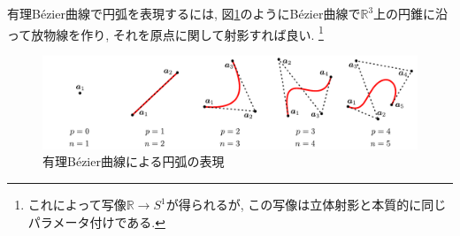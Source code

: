 \documentclass{jsarticle}
\theoremstyle{definition}%
\begin{document}
\newpage
有理B\'ezier曲線で円弧を表現するには, 図\ref{Fig202}のようにB\'ezier曲線で$\mathbb{R}^3$上の円錐に沿って放物線を作り, それを原点に関して射影すれば良い.%
\footnote{これによって写像$\mathbb{R}\to S^1$が得られるが, この写像は立体射影と本質的に同じパラメータ付けである.}
\addtocounter{footnote}{-1}
\begin{figure}[htbp]
	\centering
    \includegraphics[page=5,clip,width=160mm]{fig.pdf}
	\caption{有理B\'ezier曲線による円弧の表現\protect \footnotemark}
	\label{Fig202}
\end{figure}
\end{document}
